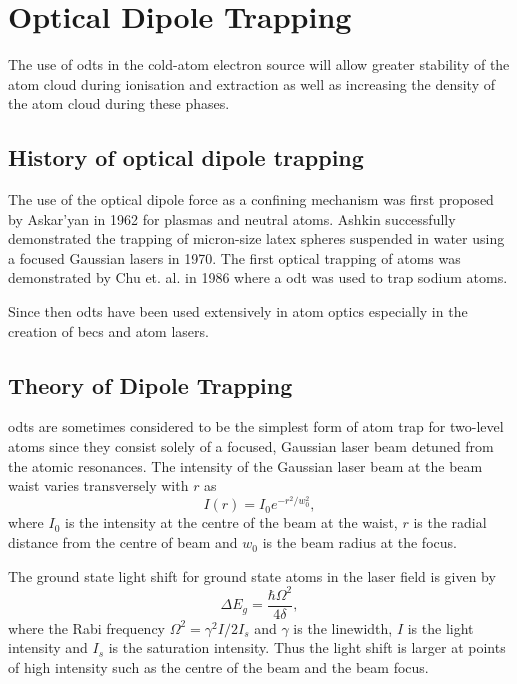 \section{Optical Dipole Trapping}

The use of \glspl{odt} in the cold-atom electron source will allow greater stability of the atom cloud during ionisation and extraction as well as increasing the density of the atom cloud during these phases.

\subsection{History of optical dipole trapping}
The use of the optical dipole force as a confining mechanism was first proposed by Askar'yan in 1962\cite{askaryan_effects_1962} for plasmas and neutral atoms. Ashkin successfully demonstrated the trapping of micron-size latex spheres suspended in water using a focused Gaussian lasers in 1970\cite{ashkin_acceleration_1970}. The first optical trapping of atoms was demonstrated by Chu et. al. in 1986\cite{chu_experimental_1986} where a \gls{odt} was used to trap sodium atoms.

Since then \glspl{odt} have been used extensively in atom optics especially in the creation of \glspl{bec} and atom lasers.

\subsection{Theory of Dipole Trapping}
\Glspl{odt} are sometimes considered to be the simplest form of atom trap for two-level atoms since they consist solely of a focused, Gaussian laser beam detuned from the atomic resonances. The intensity of the Gaussian laser beam at the beam waist varies transversely with $r$ as
\begin{equation}
I(r) = I_0e^{-r^2 / w_0^2},
\end{equation}
where $I_0$ is the intensity at the centre of the beam at the waist, $r$ is the radial distance from the centre of beam and $w_0$ is the beam radius at the focus.

The ground state light shift for ground state atoms in the laser field is given by\cite{metcalf_laser_1999}
\begin{equation}
\Delta E_g = \frac{\hbar \Omega^2}{4\delta},
\end{equation}
where the Rabi frequency $\Omega^2= \gamma^2 I / 2 I_s$ and $\gamma$ is the linewidth, $I$ is the light intensity and $I_s$ is the saturation intensity. Thus the light shift is larger at points of high intensity such as the centre of the beam and the beam focus.

